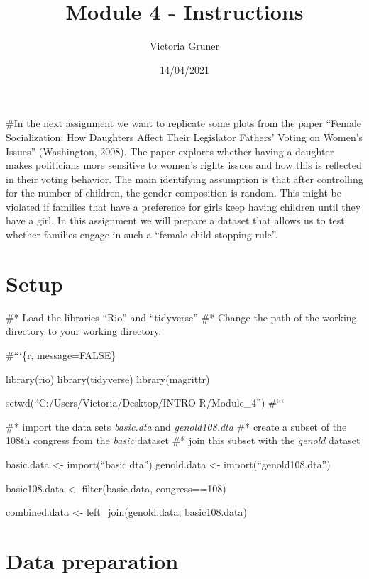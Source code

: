 \documentclass[
]{article}
\title{Module 4 - Instructions}
\author{Victoria Gruner}
\date{14/04/2021}
\begin{document}
\maketitle

\#In the next assignment we want to replicate some plots from the paper
``Female Socialization: How Daughters Affect Their Legislator Fathers'
Voting on Women's Issues'' (Washington, 2008). The paper explores
whether having a daughter makes politicians more sensitive to women's
rights issues and how this is reflected in their voting behavior. The
main identifying assumption is that after controlling for the number of
children, the gender composition is random. This might be violated if
families that have a preference for girls keep having children until
they have a girl. In this assignment we will prepare a dataset that
allows us to test whether families engage in such a ``female child
stopping rule''.

\hypertarget{setup}{%
\section{Setup}\label{setup}}

\#* Load the libraries ``Rio'' and ``tidyverse'' \#* Change the path of
the working directory to your working directory.

\#```\{r, message=FALSE\}

library(rio) library(tidyverse) library(magrittr)

setwd(``C:/Users/Victoria/Desktop/INTRO R/Module\_4'') \#```

\#* import the data sets \emph{basic.dta} and \emph{genold108.dta} \#*
create a subset of the 108th congress from the \emph{basic} dataset \#*
join this subset with the \emph{genold} dataset

basic.data \textless- import(``basic.dta'') genold.data \textless-
import(``genold108.dta'')

basic108.data \textless- filter(basic.data, congress==108)

combined.data \textless- left\_join(genold.data, basic108.data)

\hypertarget{data-preparation}{%
\section{Data preparation}\label{data-preparation}}
\end{document}

